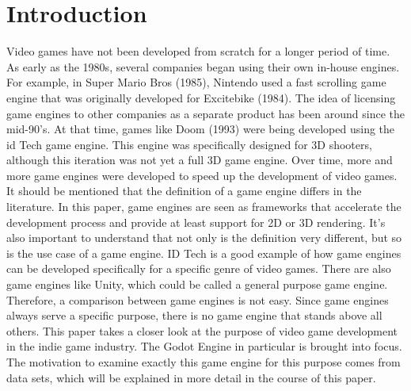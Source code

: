 \section{Introduction}
Video games have not been developed from scratch for a longer period of time.
As early as the 1980s, several companies began using their own in-house engines.
For example, in Super Mario Bros (1985), Nintendo used a fast scrolling game engine that was originally developed for Excitebike (1984)\cite{history-digital-games}.
The idea of licensing game engines to other companies as a separate product has been around since the mid-90's.
At that time, games like Doom (1993) were being developed using the id Tech game engine\cite{id-tech-doom}.
This engine was specifically designed for 3D shooters, although this iteration was not yet a full 3D game engine.
Over time, more and more game engines were developed to speed up the development of video games.
It should be mentioned that the definition of a game engine differs in the literature.
In this paper, game engines are seen as frameworks that accelerate the development process and provide at least support for 2D or 3D rendering.
It's also important to understand that not only is the definition very different, but so is the use case of a game engine.
ID Tech is a good example of how game engines can be developed specifically for a specific genre of video games.
There are also game engines like Unity, which could be called a general purpose game engine.
Therefore, a comparison between game engines is not easy.
Since game engines always serve a specific purpose, there is no game engine that stands above all others.
This paper takes a closer look at the purpose of video game development in the indie game industry.
The Godot Engine in particular is brought into focus.
The motivation to examine exactly this game engine for this purpose comes from data sets, which will be explained in more detail in the course of this paper.

